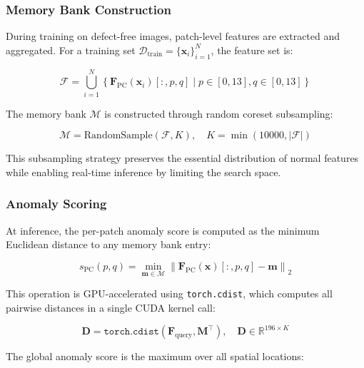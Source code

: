 \documentclass[journal]{IEEEtran}
\begin{document}
\subsubsection{Memory Bank Construction}

During training on defect-free images, patch-level features are extracted and aggregated. For a training set $\mathcal{D}_{\text{train}} = \{\mathbf{x}_i\}_{i=1}^{N}$, the feature set is:

\begin{equation}
    \mathcal{F} = \bigcup_{i=1}^{N} \left\{\mathbf{F}_{\text{PC}}(\mathbf{x}_i)[:, p, q] \;|\; p\in[0,13], q\in[0,13]\right\}
    \label{eq:feature_set}
\end{equation}

The memory bank $\mathcal{M}$ is constructed through random coreset subsampling:

\begin{equation}
    \mathcal{M} = \text{RandomSample}(\mathcal{F}, K), \quad K = \min(10000, |\mathcal{F}|)
    \label{eq:coreset}
\end{equation}

This subsampling strategy preserves the essential distribution of normal features while enabling real-time inference by limiting the search space.

\subsubsection{Anomaly Scoring}

At inference, the per-patch anomaly score is computed as the minimum Euclidean distance to any memory bank entry:

\begin{equation}
    s_{\text{PC}}(p, q) = \min_{\mathbf{m} \in \mathcal{M}} \left\| \mathbf{F}_{\text{PC}}(\mathbf{x})[:, p, q] - \mathbf{m} \right\|_2
    \label{eq:dino_score}
\end{equation}

This operation is GPU-accelerated using \texttt{torch.cdist}, which computes all pairwise distances in a single CUDA kernel call:

\begin{equation}
    \mathbf{D} = \texttt{torch.cdist}(\mathbf{F}_{\text{query}}, \mathbf{M}^\top), \quad \mathbf{D} \in \mathbb{R}^{196 \times K}
    \label{eq:cdist}
\end{equation}

The global anomaly score is the maximum over all spatial locations:
\end{document}
